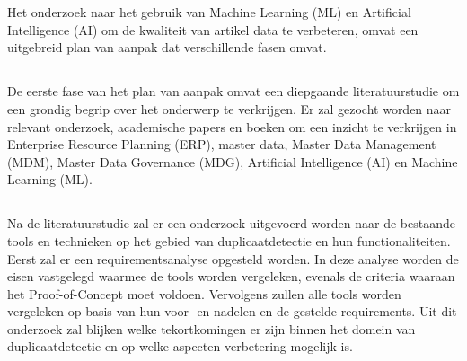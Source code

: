 
\chapter{}%
\label{ch:methodologie}

Het onderzoek naar het gebruik van Machine Learning (ML) en Artificial Intelligence (AI) om de kwaliteit van artikel data te verbeteren, omvat een uitgebreid plan van aanpak dat verschillende fasen omvat.

\section{}%
\label{sec:LiteratuurstudieM}
De eerste fase van het plan van aanpak omvat een diepgaande literatuurstudie om een grondig begrip over het onderwerp te verkrijgen. Er zal gezocht worden naar relevant onderzoek, academische papers en boeken om een inzicht te verkrijgen in Enterprise Resource Planning (ERP), master data, Master Data Management (MDM), Master Data Governance (MDG), Artificial Intelligence (AI) en Machine Learning (ML).

\section{}%
\label{sec:OnderzoekM}
Na de literatuurstudie zal er een onderzoek uitgevoerd worden naar de bestaande tools en technieken op het gebied van duplicaatdetectie en hun functionaliteiten. Eerst zal er een requirementsanalyse opgesteld worden. In deze analyse worden de eisen vastgelegd waarmee de tools worden vergeleken, evenals de criteria waaraan het Proof-of-Concept moet voldoen. Vervolgens zullen alle tools worden vergeleken op basis van hun voor- en nadelen en de gestelde requirements. Uit dit onderzoek zal blijken welke tekortkomingen er zijn binnen het domein van duplicaatdetectie en op welke aspecten verbetering mogelijk is.

